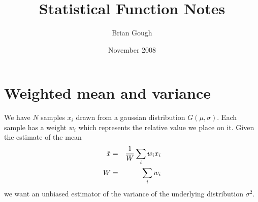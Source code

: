 \documentclass[fleqn,12pt]{article}
\begin{document}
\title{Statistical Function Notes}
\author{Brian Gough}
\date{November 2008}
\maketitle

\section{Weighted mean and variance}
We have $N$ samples $x_i$ drawn from a gaussian distribution
$G(\mu,\sigma)$.  Each sample has a weight $w_i$ which represents the
relative value we place on it.  Given the estimate of the mean
%
\begin{eqnarray}
\bar{x} &=& {1 \over W} \sum_i w_i x_i \\
W       &=& \sum_i w_i
\end{eqnarray}
%
\noindent
we want an unbiased estimator of the variance of the underlying
distribution $\sigma^2$.  
\end{document}

